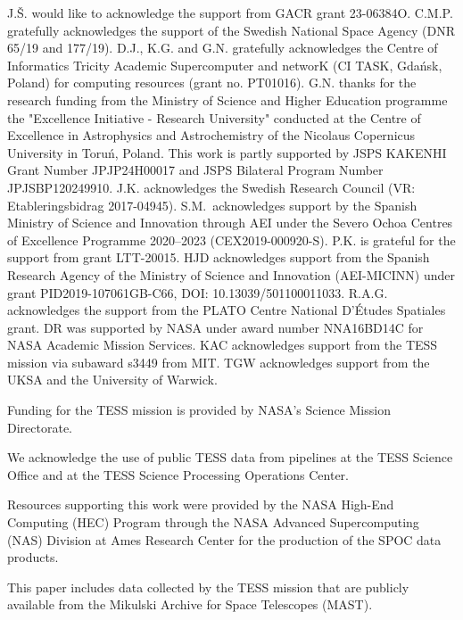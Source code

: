 \documentclass[traditabstract,longauth]{aa}
\begin{document}
%
%
\begin{acknowledgements}
J.\v{S}. would like to acknowledge the support from GACR grant 23-06384O.
C.M.P. gratefully acknowledges the support of the  Swedish National Space Agency (DNR 65/19 and  177/19).
D.J., K.G. and G.N. gratefully acknowledges the Centre of Informatics Tricity Academic Supercomputer and networK (CI TASK, Gda\'nsk, Poland) for computing resources (grant no. PT01016).
G.N. thanks for the research funding from the Ministry of Science and Higher Education programme the "Excellence Initiative - Research University" conducted at the Centre of Excellence in Astrophysics and Astrochemistry of the Nicolaus Copernicus University in Toru\'n, Poland.
This work is partly supported by JSPS KAKENHI Grant Number
JPJP24H00017 and JSPS Bilateral Program Number JPJSBP120249910.
J.K. acknowledges the Swedish Research Council (VR: Etableringsbidrag 2017-04945).
S.M.\ acknowledges support by the Spanish Ministry of Science and Innovation through AEI under the Severo Ochoa Centres of Excellence Programme 2020--2023 (CEX2019-000920-S).
P.K. is grateful for the support from grant LTT-20015.
HJD acknowledges support from the Spanish Research Agency of the Ministry of Science and Innovation (AEI-MICINN) under grant PID2019-107061GB-C66, DOI:
10.13039/501100011033.
R.A.G. acknowledges the support from the PLATO Centre National D'{\'{E}}tudes Spatiales grant.
DR was supported by NASA under award number NNA16BD14C for NASA Academic Mission Services.
KAC acknowledges support from the TESS mission via subaward s3449 from MIT.
TGW acknowledges support from the UKSA and the University of Warwick.

Funding for the TESS mission is provided by NASA's Science Mission Directorate.

We acknowledge the use of public TESS data from pipelines at the TESS Science Office and at the TESS Science Processing Operations Center.

Resources supporting this work were provided by the NASA High-End Computing (HEC) Program through the NASA Advanced Supercomputing (NAS) Division at Ames Research Center for the production of the SPOC data products.


This paper includes data collected by the TESS mission that are publicly available from the Mikulski Archive for Space Telescopes (MAST).


\end{acknowledgements}
\end{document}
